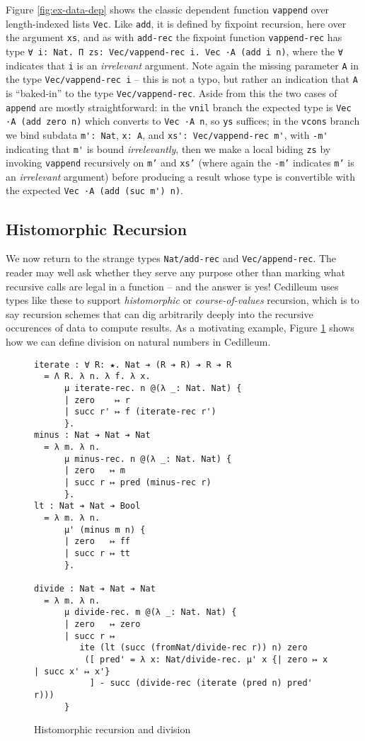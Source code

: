 \documentclass{article}
\begin{document}
Figure \ref{fig:ex-data-dep} shows the classic dependent function
\texttt{vappend} over length-indexed lists \texttt{Vec}. Like \texttt{add}, it is
defined by fixpoint recursion, here over the argument \texttt{xs}, and as with
\texttt{add-rec} the fixpoint function \texttt{vappend-rec} has type
\verb;∀ i: Nat. Π zs: Vec/vappend-rec i. Vec ·A (add i n);, where the \texttt{∀}
indicates that \texttt{i} is an \textit{irrelevant} argument. Note again the
missing parameter \texttt{A} in the type \texttt{Vec/vappend-rec i} -- this is
not a typo, but rather an indication that \texttt{A} is ``baked-in'' to the type
\texttt{Vec/vappend-rec}. Aside from this the two cases of \texttt{append} are
mostly straightforward: in the \texttt{vnil} branch the expected type is
\verb;Vec ·A (add zero n); which converts to \verb;Vec ·A n;, so \texttt{ys}
suffices; in the \texttt{vcons} branch we bind subdata \verb;m': Nat;,
\verb;x: A;, and \verb;xs': Vec/vappend-rec m';, with \verb;-m'; indicating
that \verb;m'; is bound \textit{irrelevantly}, then we make a local biding
\texttt{zs} by invoking \verb;vappend; recursively on \texttt{m'} and
\texttt{xs'} (where again the \texttt{-m'} indicates \texttt{m'} is an
\textit{irrelevant} argument) before producing a result whose type is
convertible with the expected \verb;Vec ·A (add (suc m') n);.

\subsection{Histomorphic Recursion}
We now return to the strange types \verb;Nat/add-rec; and \verb;Vec/append-rec;.
The reader may well ask whether they serve any purpose other than marking what
recursive calls are legal in a function -- and the answer is yes! Cedilleum uses
types like these to support \textit{histomorphic} or \textit{course-of-values}
recursion, which is to say recursion schemes that can dig arbitrarily deeply
into the recursive occurences of data to compute results. As a motivating
example, Figure \ref{fig:ex-data-div} shows how we can define division on
natural numbers in Cedilleum.

\begin{figure}[h]
\begin{verbatim}
iterate : ∀ R: ★. Nat ➔ (R ➔ R) ➔ R ➔ R
  = Λ R. λ n. λ f. λ x.
      μ iterate-rec. n @(λ _: Nat. Nat) {
      | zero    ↦ r
      | succ r' ↦ f (iterate-rec r') 
      }.
minus : Nat ➔ Nat ➔ Nat
  = λ m. λ n.
      μ minus-rec. n @(λ _: Nat. Nat) {
      | zero   ↦ m
      | succ r ↦ pred (minus-rec r)
      }.
lt : Nat ➔ Nat ➔ Bool
  = λ m. λ n.
      μ' (minus m n) {
      | zero   ↦ ff
      | succ r ↦ tt
      }.

divide : Nat ➔ Nat ➔ Nat
  = λ m. λ n.
      μ divide-rec. m @(λ _: Nat. Nat) {
      | zero   ↦ zero
      | succ r ↦
         ite (lt (succ (fromNat/divide-rec r)) n) zero
          ([ pred' = λ x: Nat/divide-rec. μ' x {| zero ↦ x | succ x' ↦ x'}
           ] - succ (divide-rec (iterate (pred n) pred' r)))
      }
\end{verbatim}
  \caption{Histomorphic recursion and division}
  \label{fig:ex-data-div}
\end{figure}
\end{document}
